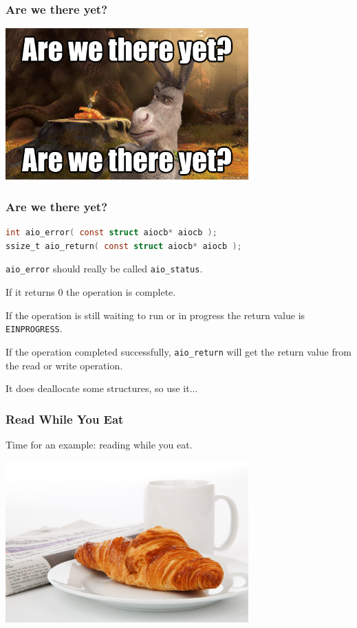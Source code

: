 \begin{frame}
\frametitle{Are we there yet?}

\begin{center}
	\includegraphics[width=0.7\textwidth]{images/arewethereyet.jpg}
\end{center}

\end{frame}


\begin{frame}[fragile]
\frametitle{Are we there yet?}

\begin{lstlisting}[language=C]
int aio_error( const struct aiocb* aiocb );
ssize_t aio_return( const struct aiocb* aiocb );
\end{lstlisting}

\texttt{aio\_error} should really be called \texttt{aio\_status}. 

If it returns 0 the operation is complete.

If the operation is still waiting to run or in progress the return value is \texttt{EINPROGRESS}.

If the operation completed successfully, \texttt{aio\_return} will get the return value from the read or write operation. 

It does deallocate some structures, so use it...

\end{frame}


\begin{frame}
\frametitle{Read While You Eat}

Time for an example: reading while you eat.

\begin{center}
	\includegraphics[width=0.7\textwidth]{images/croissant-newspaper-and-tea.jpg}
\end{center}

\end{frame}


